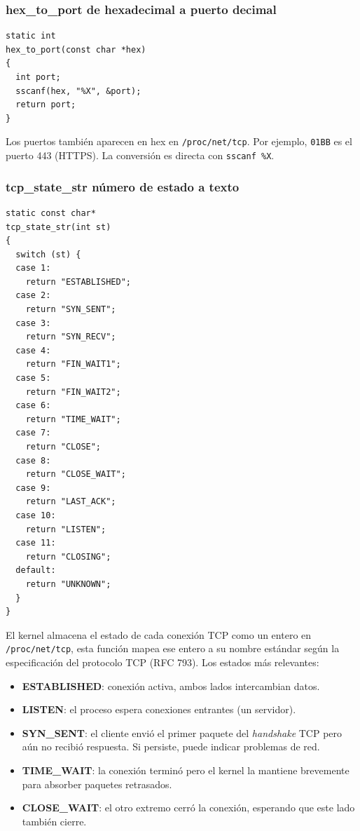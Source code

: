 \documentclass[12pt,letterpaper]{article}
\begin{document}
\subsubsection*{hex\_to\_port de hexadecimal a puerto decimal}

\begin{lstlisting}[style=modernc, caption={\texttt{net\_monitor.c} hex\_to\_port()}]
static int
hex_to_port(const char *hex)
{
  int port;
  sscanf(hex, "%X", &port);
  return port;
}
\end{lstlisting}

Los puertos también aparecen en hex en \texttt{/proc/net/tcp}. Por ejemplo, \texttt{01BB} es el puerto 443
(HTTPS). La conversión es directa con \texttt{sscanf \%X}.

\subsubsection*{tcp\_state\_str número de estado a texto}

\begin{lstlisting}[style=modernc, caption={\texttt{net\_monitor.c} tcp\_state\_str()}]
static const char*
tcp_state_str(int st)
{
  switch (st) {
  case 1:
    return "ESTABLISHED";
  case 2:
    return "SYN_SENT";
  case 3:
    return "SYN_RECV";
  case 4:
    return "FIN_WAIT1";
  case 5:
    return "FIN_WAIT2";
  case 6:
    return "TIME_WAIT";
  case 7:
    return "CLOSE";
  case 8:
    return "CLOSE_WAIT";
  case 9:
    return "LAST_ACK";
  case 10:
    return "LISTEN";
  case 11:
    return "CLOSING";
  default:
    return "UNKNOWN";
  }
}
\end{lstlisting}

El kernel almacena el estado de cada conexión TCP como un entero en \texttt{/proc/net/tcp}, esta función mapea
ese entero a su nombre estándar según la especificación del protocolo TCP (RFC 793). Los estados más relevantes:

\begin{itemize}[leftmargin=1.5cm]
\item \textbf{ESTABLISHED}: conexión activa, ambos lados intercambian datos.
\item \textbf{LISTEN}: el proceso espera conexiones entrantes (un servidor).
\item \textbf{SYN\_SENT}: el cliente envió el primer paquete del \textit{handshake}
  TCP pero aún no recibió respuesta. Si persiste, puede indicar problemas de red.
\item \textbf{TIME\_WAIT}: la conexión terminó pero el kernel la mantiene
  brevemente para absorber paquetes retrasados.
\item \textbf{CLOSE\_WAIT}: el otro extremo cerró la conexión, esperando
  que este lado también cierre.
\end{itemize}
\end{document}
